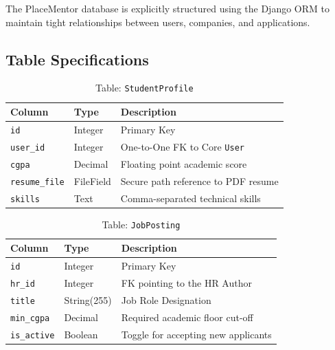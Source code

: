 \documentclass[a4paper,12pt]{report}
\begin{document}
The PlaceMentor database is explicitly structured using the Django ORM to maintain tight relationships between users, companies, and applications.

\subsection{Table Specifications}

\begin{table}[H]
\centering
\caption{Table: \texttt{StudentProfile}}
\vspace{6pt}
\renewcommand{\arraystretch}{1.3}
\begin{tabular}{|l|l|p{7cm}|}
\hline
\textbf{Column} & \textbf{Type} & \textbf{Description} \\
\hline
\texttt{id}            & Integer     & Primary Key \\
\texttt{user\_id}      & Integer     & One-to-One FK to Core \texttt{User} \\
\texttt{cgpa}          & Decimal     & Floating point academic score \\
\texttt{resume\_file}  & FileField   & Secure path reference to PDF resume \\
\texttt{skills}        & Text        & Comma-separated technical skills \\
\hline
\end{tabular}
\label{tab:db_student}
\end{table}

\begin{table}[H]
\centering
\caption{Table: \texttt{JobPosting}}
\vspace{6pt}
\renewcommand{\arraystretch}{1.3}
\begin{tabular}{|l|l|p{7cm}|}
\hline
\textbf{Column} & \textbf{Type} & \textbf{Description} \\
\hline
\texttt{id}            & Integer     & Primary Key \\
\texttt{hr\_id}        & Integer     & FK pointing to the HR Author \\
\texttt{title}         & String(255) & Job Role Designation \\
\texttt{min\_cgpa}     & Decimal     & Required academic floor cut-off \\
\texttt{is\_active}    & Boolean     & Toggle for accepting new applicants \\
\hline
\end{tabular}
\label{tab:db_jobs}
\end{table}
\end{document}
